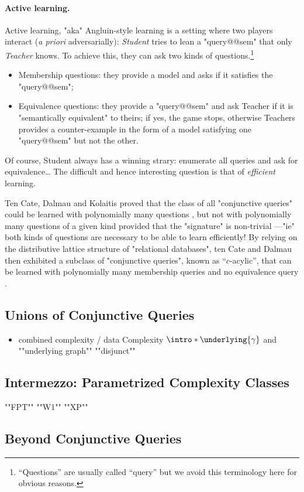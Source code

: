 \paragraph*{Active learning.}
Active learning, "aka" Angluin-style learning is a setting where
two players interact (\emph{a priori} adversarially): \emph{Student} tries
to lean a "query@@sem" that only \emph{Teacher} knows. To achieve this,
they can ask two kinds of questions.\footnote{``Questions'' are usually called 
``query'' but we avoid this terminology here for obvious reasons.}
\begin{itemize}
	\item Membership questions: they provide a model and asks if it satisfies the "query@@sem";
	\item Equivalence questions: they provide a "query@@sem" and ask Teacher if
		it is "semantically equivalent" to theirs; if yes, the game stops, otherwise
		Teachers provides a counter-example in the form of a model satisfying
		one "query@@sem" but not the other.
\end{itemize}
Of course, Student always has a winning strary: enumerate all queries
and ask for equivalence… The difficult and hence interesting question
is that of \emph{efficient} learning.

Ten Cate, Dalmau and Kolaitis proved that 
the class of all "conjunctive queries" could be
learned with polynomially many questions \cite[Theorem~A]{tenCateDalmauKolaitis2013Learning},
but not with polynomially many questions of a given kind provided
that the "signature" is non-trivial \cite[Theorem~B]{tenCateDalmauKolaitis2013Learning}---"ie"
both kinds of questions are necessary to be able to learn efficiently!
By relying on the distributive lattice structure of "relational databases",
ten Cate and Dalmau then exhibited a subclass of "conjunctive queries",
known as ``$c$-acylic'', that can be learned with
polynomially many membership queries
and no equivalence query \cite[Theorem~5.2]{tenCateDalmau2021ActiveLearning}.


\subsection{Unions of Conjunctive Queries}
\label{sec:prelim-db-ucq}

\begin{itemize}
	\item combined complexity / data Complexity
	\itemAP $\intro*\underlying{\gamma}$ and ""underlying graph""
	\itemAP ""disjunct""
\end{itemize}

\subsection{Intermezzo: Parametrized Complexity Classes}

\begin{itemize}
	\itemAP ""FPT""
	\itemAP ""W1""
	\itemAP ""XP""
\end{itemize}

\subsection{Beyond Conjunctive Queries}